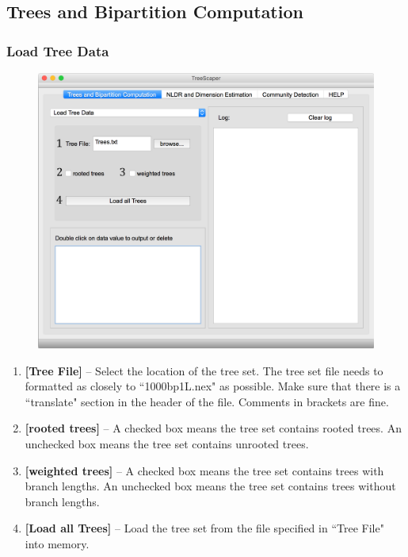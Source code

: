 \documentclass[11pt]{article}
\begin{document}
\subsection{Trees and Bipartition Computation}\label{subsect:TreeBipartComp}


\subsubsection{Load Tree Data}\label{subsubsect:LoadTreeData}

\begin{figure}[thbp!]\centering
\includegraphics[scale=0.4]{imagesForManual/Figure6_6_1_1.png}
\end{figure}

\begin{enumerate}[{\bf 1-}]
\item {\bf [Tree File]} -- Select the location of the tree set. The tree set file needs to formatted as closely
to ``1000bp1L.nex" as possible. Make sure that there is a ``translate" section in the header of
the file. Comments in brackets are fine.

\item {\bf [rooted trees]} -- A checked box means the tree set contains rooted trees. An unchecked box
means the tree set contains unrooted trees.

\item {\bf [weighted trees]} -- A checked box means the tree set contains trees with branch lengths. An
unchecked box means the tree set contains trees without branch lengths.

\item {\bf [Load all Trees]} -- Load the tree set from the file specified in ``Tree File" into memory.
\end{enumerate}
\end{document}
